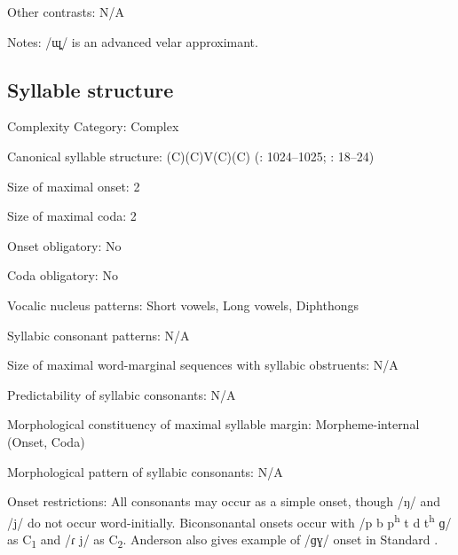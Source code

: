 {\begin{appendixdesc}
\item[Other contrasts:] N/A

\item[Notes:] /ɰ̟/ is an advanced velar approximant.
\end{appendixdesc}
\subsection*{Syllable structure}
\begin{appendixdesc}

\item[Complexity Category:] Complex

\item[Canonical syllable structure:] (C)(C)V(C)(C) (\citealt{Anderson1997}: 1024--1025; \citealt{Yoshioka2012}: 18--24)

\item[Size of maximal onset:] 2

\item[Size of maximal coda:] 2

\item[Onset obligatory:] No

\item[Coda obligatory:] No

\item[Vocalic nucleus patterns:] Short vowels, Long vowels, Diphthongs

\item[Syllabic consonant patterns:] N/A

\item[Size of maximal word-marginal sequences with syllabic obstruents:] N/A

\item[Predictability of syllabic consonants:] N/A

\item[Morphological constituency of maximal syllable margin:] Morpheme-internal (Onset, Coda)

\item[Morphological pattern of syllabic consonants:] N/A

\item[Onset restrictions:] All consonants may occur as a simple onset, though /ŋ/ and /j/ do not occur word-initially. Biconsonantal onsets occur with /p b p\textsuperscript{h} t d t\textsuperscript{h} ɡ/ as C\textsubscript{1} and /ɾ j/ as C\textsubscript{2}. Anderson also gives example of /ɡɣ/ onset in Standard .


\end{appendixdesc}}

